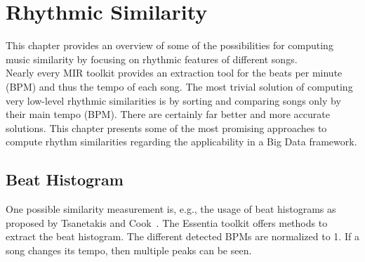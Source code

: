 \section{Rhythmic Similarity}\label{rhythmsimc}

This chapter provides an overview of some of the possibilities for computing music similarity by focusing on rhythmic features of different songs. \\
Nearly every MIR toolkit provides an extraction tool for the beats per minute (BPM) and thus the tempo of each song. The most trivial solution of computing very low-level rhythmic similarities is by sorting and comparing songs only by their main tempo (BPM). There are certainly far better and more accurate solutions.
This chapter presents some of the most promising approaches to compute rhythm similarities regarding the applicability in a Big Data framework.\\

\subsection{Beat Histogram}\label{beathist}

One possible similarity measurement is, e.g., the usage of beat histograms as proposed by Tsanetakis and Cook~\cite{rhythm3}. The Essentia toolkit offers methods to extract the beat histogram. The different detected BPMs are normalized to 1. If a song changes its tempo, then multiple peaks can be seen.\\ 

